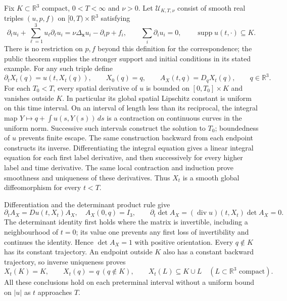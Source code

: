 Fix $K\subset\mathbb R^3$ compact, $0<T<\infty$ and $\nu>0$.
Let $\mathcal U_{K,T,\nu}$ consist of smooth real triples
$(u,p,f)$ on $[0,T)\times\mathbb R^3$ satisfying
\begin{equation}
 \partial_tu_i+\sum_{\ell=1}^3u_\ell\partial_\ell u_i
 =\nu\Delta_{\mathbf x}u_i-\partial_i p+f_i,\qquad
 \sum_i\partial_i u_i=0,\qquad
 \operatorname{supp}u(t,\cdot)\subseteq K .
 \label{eq:cq-NS-input-class}
\end{equation}
There is no restriction on $p,f$ beyond this definition for
the correspondence; the public theorem supplies the stronger
support and initial conditions in its stated example.
For any such triple define
\[
 \partial_tX_t(q)=u(t,X_t(q)),\qquad X_0(q)=q,\qquad
 A_X(t,q)=D_qX_t(q),\qquad q\in\mathbb R^3 .
\]
For each $T_0<T$, every spatial derivative of $u$ is bounded
on $[0,T_0]\times K$ and vanishes outside $K$.
In particular its global spatial Lipschitz constant is
uniform on this time interval. On an interval of length
less than its reciprocal, the integral map
$Y\mapsto q+\int u(s,Y(s))\,ds$ is a contraction on
continuous curves in the uniform norm. Successive such
intervals construct the solution to $T_0$; boundedness of
$u$ prevents finite escape. The same construction backward
from each endpoint constructs its inverse. Differentiating
the integral equation gives a linear integral equation for
each first label derivative, and then successively for every
higher label and time derivative. The same local contraction
and induction prove smoothness and uniqueness of these
derivatives. Thus $X_t$ is a smooth global diffeomorphism
for every $t<T$.

Differentiation and the determinant product rule give
\[
 \partial_t A_X=Du(t,X_t)A_X,\quad A_X(0,q)=I_3,\qquad
 \partial_t\det A_X=(\operatorname{div}u)(t,X_t)\det A_X=0 .
\]
The determinant identity first holds where the matrix is
invertible, including a neighbourhood of $t=0$; its value
one prevents any first loss of invertibility and continues
the identity. Hence $\det A_X=1$ with positive orientation.
Every $q\notin K$ has its constant trajectory. An endpoint
outside $K$ also has a constant backward trajectory, so
inverse uniqueness proves
\begin{equation}
 X_t(K)=K,\qquad X_t(q)=q\ (q\notin K),\qquad
 X_t(L)\subseteq K\cup L\quad(L\subset\mathbb R^3\text{ compact}).
 \label{eq:cq-NS-flow-support}
\end{equation}
All these conclusions hold on each preterminal interval
without a uniform bound on $|u|$ as $t$ approaches $T$.

